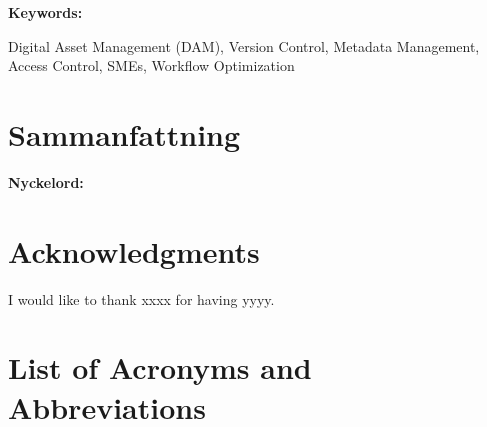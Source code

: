 \documentclass[a4paper,12pt,twocolumn]{article}
\numberwithin{figure}{section}
\numberwithin{table}{section}
\begin{document}
\vspace{0.3cm} 
\textbf{Keywords:} 
    
Digital Asset Management (DAM), Version Control, Metadata Management, Access Control, SMEs, Workflow Optimization

\section*{Sammanfattning}

\vspace{0.3cm} 
\textbf{Nyckelord:} 
\newpage

\section*{Acknowledgments}
I would like to thank xxxx for having yyyy.

\newpage
{} 
\onecolumn
\tableofcontents
\newpage

\newpage
{} 
{}
\listoffigures
\newpage
{} 
{}
\listoftables

\newpage
{}
{}
\section*{List of Acronyms and Abbreviations}
\vspace{0.2cm} %
\end{document}

